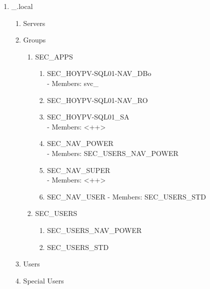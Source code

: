 \begin{enumerate}
	\item \_<++>.local
		\begin{enumerate}
			\item Servers
			\item Groups
				\begin{enumerate}
					\item SEC\_APPS
						\begin{enumerate}
							\item SEC\_HOYPV-SQL01-NAV\_DBo	\\
								- Members: svc\_<++>
							\item SEC\_HOYPV-SQL01-NAV\_RO
							\item SEC\_HOYPV-SQL01\_SA		\\
								- Members: <++>
							\item SEC\_NAV\_POWER			\\
								- Members: SEC\_USERS\_NAV\_POWER
							\item SEC\_NAV\_SUPER			\\
								- Members: <++>
							\item SEC\_NAV\_USER
								- Members: SEC\_USERS\_STD
						\end{enumerate}
					\item SEC\_USERS
						\begin{enumerate}
							\item SEC\_USERS\_NAV\_POWER
							\item SEC\_USERS\_STD
						\end{enumerate}
				\end{enumerate}
			\item Users
			\item Special Users
		\end{enumerate}
\end{enumerate}
